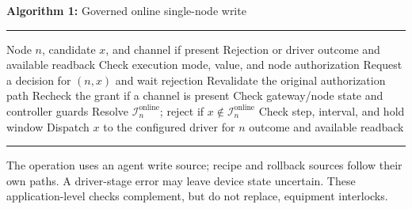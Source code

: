 \par\medskip
\noindent\begin{minipage}{\columnwidth}
\small
\noindent\textbf{Algorithm 1:} Governed online single-node write
\par\kern2pt\hrule\kern2pt
\begin{algorithmic}[1]
\Require Node $n$, candidate $x$, and channel if present
\Ensure Rejection or driver outcome and available readback
\State Check execution mode, value, and node authorization
  \State Request a decision for $(n,x)$ and wait
    \State \Return rejection
  \EndIf
  \State Revalidate the original authorization path
\EndIf
\State Recheck the grant if a channel is present
\State Check gateway/node state and controller guards
\State Resolve $\mathcal{I}^{\mathrm{online}}_n$; reject if $x\notin\mathcal{I}^{\mathrm{online}}_n$
  \State Check step, interval, and hold window
\EndIf
\State Dispatch $x$ to the configured driver for $n$
\State \Return outcome and available readback
\end{algorithmic}
\kern2pt\hrule
\end{minipage}
\par\medskip

The operation uses an agent write source; recipe and rollback sources follow
their own paths. A driver-stage error may leave device state uncertain.
These application-level
checks complement, but do not replace, equipment interlocks.


